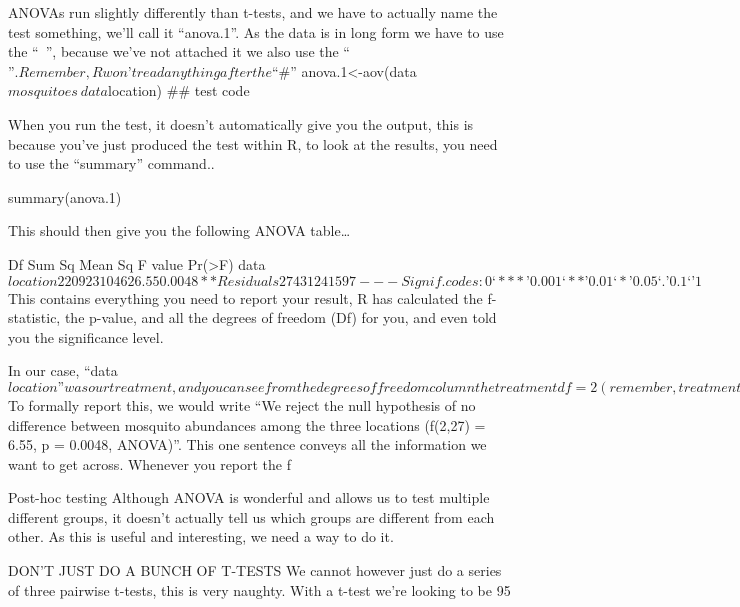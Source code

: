 \documentclass{article}
\begin{document}
ANOVAs run slightly differently than t-tests, and we have to actually name the test something, we’ll call it “anova.1”. As the data is in long form we have to use the “~”, because we’ve not attached it we also use the “$”. Remember, R won’t read anything after the “\#”
$
anova.1<-aov(data$mosquitoes~data$location) \#\# test code

When you run the test, it doesn’t automatically give you the output, this is because you’ve just produced the test within R, to look at the results, you need to use the “summary” command..

summary(anova.1)

This should then give you the following ANOVA table…



              Df Sum Sq  Mean Sq  F value   Pr(>F)   
data$location  2  20923   10462    6.55    0.0048 **
Residuals     27  43124    1597                  
---
Signif. codes:  0 ‘***’ 0.001 ‘**’ 0.01 ‘*’ 0.05 ‘.’ 0.1 ‘ ’ 1 
$
This contains everything you need to report your result, R has calculated the f-statistic, the p-value, and all the degrees of freedom (Df) for you, and even told you the significance level. 

In our case, “data$location” was our treatment, and you can see from the degrees of freedom column the treatment df=2 (remember, treatment degrees of freedom equal number of levels minus one). It has given us our error degrees of freedom (Although R calls these “Residuals”, just to be difficult). So how do we report this, bearing in mind what our original question was; are there differences in mosquito abundance between the locations?
$
To formally report this, we would write “We reject the null hypothesis of no difference between mosquito abundances among the three locations (f(2,27) = 6.55, p = 0.0048, ANOVA)”. This one sentence conveys all the information we want to get across. Whenever you report the f

Post-hoc testing
Although ANOVA is wonderful and allows us to test multiple different groups, it doesn’t actually tell us which groups are different from each other. As this is useful and interesting, we need a way to do it. 

DON’T JUST DO A BUNCH OF T-TESTS
We cannot however just do a series of three pairwise t-tests, this is very naughty. With a t-test we’re looking to be 95%
\end{document}

